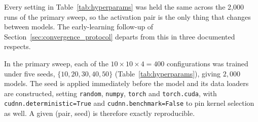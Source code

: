 %
%


%
%

Every setting in Table~\ref{tab:hyperparams} was held the same
across the 2{,}000 runs of the primary sweep, so the activation
pair is the only thing that changes between models. The
early-learning follow-up of Section~\ref{sec:convergence_protocol}
departs from this in three documented respects.


%

In the primary sweep, each of the $10\times10\times4 = 400$
configurations was trained under five seeds,
$\{10,20,30,40,50\}$ (Table~\ref{tab:hyperparams}), giving
$2{,}000$ models. The seed is applied immediately before the
model and its data loaders are constructed, setting
\texttt{random}, \texttt{numpy}, \texttt{torch} and
\texttt{torch.cuda}, with \texttt{cudnn.deterministic=True} and
\texttt{cudnn.benchmark=False} to pin kernel selection as well.
A given (pair, seed) is therefore exactly reproducible.


